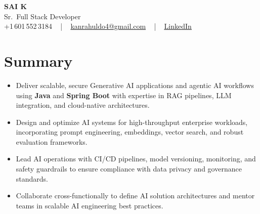 \documentclass[letterpaper,11pt]{article}
\newcommand{\resumeItem}[1]{
  \item\footnotesize{
    {#1 \vspace{-2pt}}
  }
}
\newcommand{\resumeItemListStart}{\begin{itemize}[leftmargin=*]}
\newcommand{\resumeItemListEnd}{\end{itemize}\vspace{-5pt}}
\begin{document}
\begin{center}
    {\fontsize{14pt}{12pt}\selectfont \textbf{\MakeUppercase{Sai K}}}\\ \vspace{2pt}
    \fontsize{10pt}{12pt}\selectfont Sr.\ Full Stack Developer\\ \vspace{2pt}
    \fontsize{10pt}{12pt}\selectfont +1\,601\,552\,3184 ~ | ~
    \href{mailto:kanrahuldo4@gmail.com}{kanrahuldo4@gmail.com} ~ | ~
    \href{https://www.linkedin.com/in/srrrk/}{\color{blue}\underline{LinkedIn}}
    \vspace{-10pt}
\end{center}

\section{Summary}
\fontsize{9pt}{10pt}\selectfont
\resumeItemListStart
  \resumeItem{Deliver scalable, secure Generative AI applications and agentic AI workflows using \textbf{Java} and \textbf{Spring Boot} with expertise in RAG pipelines, LLM integration, and cloud-native architectures.}
  \resumeItem{Design and optimize AI systems for high-throughput enterprise workloads, incorporating prompt engineering, embeddings, vector search, and robust evaluation frameworks.}
  \resumeItem{Lead AI operations with CI/CD pipelines, model versioning, monitoring, and safety guardrails to ensure compliance with data privacy and governance standards.}
  \resumeItem{Collaborate cross-functionally to define AI solution architectures and mentor teams in scalable AI engineering best practices.}
\resumeItemListEnd
\vspace{-6pt}

\end{document}
